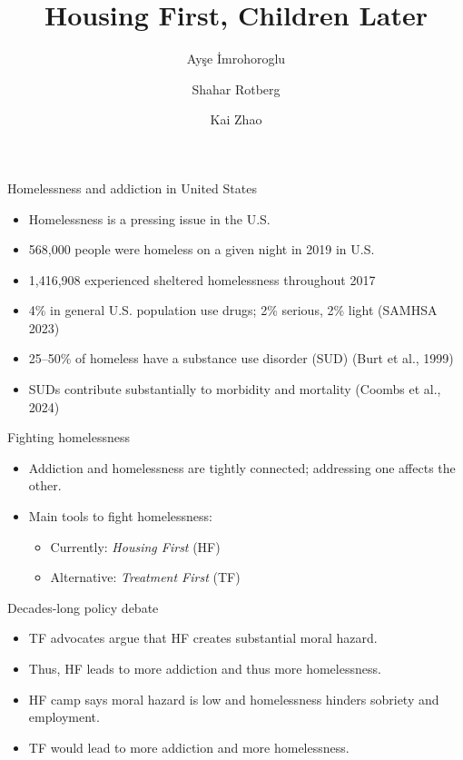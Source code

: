 \documentclass[10pt,aspectratio=169]{beamer}
\title[Housing First, Children Later]{Housing First, Children Later}
\author[Ay\c{s}e \.{I}mrohoroglu, Shahar Rotberg, Kai Zhao]{Ay\c{s}e \.{I}mrohoroglu \and Shahar Rotberg \and Kai Zhao}
\institute[USC/CMHC/UConn]{USC \quad\quad CMHC \quad\quad UConn}
\date{}
\begin{document}
\begin{frame}
  \titlepage
\end{frame}

\begin{frame}{Homelessness and addiction in United States}
\begin{itemize}
\item Homelessness is a pressing issue in the U.S.
\item 568{,}000 people were homeless on a given night in 2019 in U.S.
\item 1{,}416{,}908 experienced sheltered homelessness throughout 2017
\item 4\% in general U.S. population use drugs; 2\% serious, 2\% light (SAMHSA 2023)
\item 25--50\% of homeless have a substance use disorder (SUD) (Burt et al., 1999)
\item SUDs contribute substantially to morbidity and mortality (Coombs et al., 2024)
\end{itemize}
\end{frame}

\begin{frame}{Fighting homelessness}
\begin{itemize}
\item Addiction and homelessness are tightly connected; addressing one affects the other.
\item Main tools to fight homelessness:
\begin{itemize}
\item Currently: \emph{Housing First} (HF)
\item Alternative: \emph{Treatment First} (TF)
\end{itemize}
\end{itemize}
\end{frame}

\begin{frame}{Decades-long policy debate}
\begin{itemize}
\item TF advocates argue that HF creates substantial moral hazard.
\item Thus, HF leads to more addiction and thus more homelessness.
\item HF camp says moral hazard is low and homelessness hinders sobriety and employment.
\item TF would lead to more addiction and more homelessness.
\end{itemize}
\end{frame}
\end{document}
